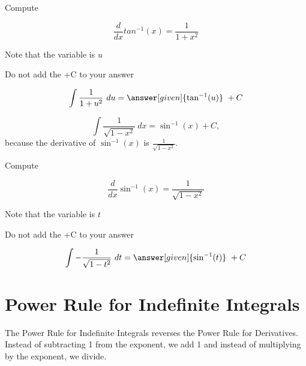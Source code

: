 \documentclass{ximera}
\begin{document}
\begin{problem} %
Compute 

\begin{hint}
\[
\frac{d}{dx} tan^{-1}(x) = \frac{1}{1+x^2}
\]
\end{hint}
\begin{hint}
Note that the variable is $u$
\end{hint}
\begin{hint}
\begin{center}
Do not add the +C to your answer
\end{center}
\end{hint}

\[
\int \frac{1}{1+u^2} \ du =
\answer[given]{\tan^{-1}(u)} \ + C
\]
\end{problem}


\begin{example} %
\[
\int \frac{1}{\sqrt{1 - x^2}} \ dx = \sin^{-1}(x) + C,
\]
because the derivative of $\sin^{-1}(x)$ 
is $\frac{1}{\sqrt{1 - x^2}}$.

\end{example}

\begin{problem} %
Compute 

\begin{hint}
\[
\frac{d}{dx} \sin^{-1}(x) = \frac{1}{\sqrt{1 - x^2}}
\]
\end{hint}
\begin{hint}
Note that the variable is $t$
\end{hint}
\begin{hint}
\begin{center}
Do not add the +C to your answer
\end{center}
\end{hint}

\[
\int -\frac{1}{\sqrt{1 - t^2}} \ dt =
\answer[given]{\sin^{-1}(t)} \ + C
\]
\end{problem}

\section{Power Rule for Indefinite Integrals}

The Power Rule for Indefinite Integrals reverses the Power Rule for Derivatives.
Instead of subtracting 1 from the exponent, we add 1 and instead of multiplying by the exponent, we divide.
\end{document}
